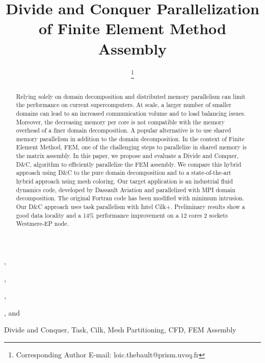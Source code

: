\documentclass[10pt]{IOS-Book-Article}
\begin{document}
\begin{frontmatter}              %

\title{Divide and Conquer Parallelization of Finite Element Method Assembly}

\author[A]{ %
\thanks{Corresponding Author E-mail: loic.thebault@prism.uvsq.fr}},
\author[A]{ },
\author[C]{ },
\author[B]{ },
and
\author[A,C]{ }

\address[A]{PRISM - University of Versailles, France}
\address[B]{Dassault Aviation, Saint-Cloud, France}
\address[C]{Exascale Computing Research, France}

\begin{abstract}
Relying solely on domain decomposition and distributed memory parallelism can limit the performance on current supercomputers.
At scale, a larger number of smaller domains can lead to an increased communication volume and to load balancing issues.
Moreover, the decreasing memory per core is not compatible with the memory overhead of a finer domain decomposition.
A popular alternative is to use shared memory parallelism in addition to the domain decomposition.
In the context of Finite Element Method, FEM, one of the challenging steps to parallelize in shared memory is the matrix assembly.
In this paper, we propose and evaluate a Divide and Conquer, D\&C, algorithm to efficiently parallelize the FEM assembly.
We compare this hybrid approach using D\&C to the pure domain decomposition and to a state-of-the-art hybrid approach using mesh coloring.
Our target application is an industrial fluid dynamics code, developed by Dassault Aviation and parallelized with MPI domain decomposition.
The original Fortran code has been modified with minimum intrusion. Our D\&C approach uses task parallelism with Intel Cilk+.
Preliminary results show a good data locality and a 14\% performance improvement on a 12 cores 2 sockets Westmere-EP node.
\end{abstract}

\begin{keyword}
Divide and Conquer, Task, Cilk, Mesh Partitioning, CFD, FEM Assembly
\end{keyword}
\end{frontmatter}

\thispagestyle{empty}
\pagestyle{empty}
\end{document}
